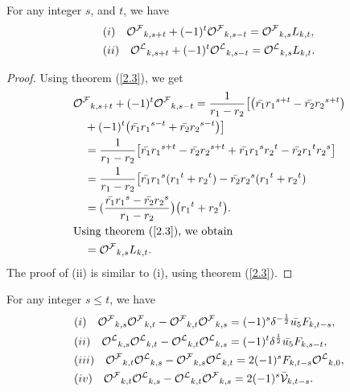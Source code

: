 \begin{theorem} For any integer $s$, and $ t$,  we have\label{2.14t}
\begin{align*}
&(i)\quad {{\mathcal{O^F}}}_{k, s+t}+(-1)^{t}{{\mathcal{O^F}}}_{k,s-t}={{\mathcal{O^F}}}_{k,s}L_{k,t},\\
&(ii)\quad {{\mathcal{O^L}}}_{k, s+t}+(-1)^{t}{{\mathcal{O^L}}}_{k,s-t}={{\mathcal{O^L}}}_{k,s}L_{k,t}.
\end{align*}
\end{theorem}
\begin{proof}
Using theorem (\ref{2.3}), we get
\begin{align*}
&{{\mathcal{O^F}}}_{k, s+t}+(-1)^{t}{{\mathcal{O^F}}}_{k,s-t}=\dfrac{1}{r_1-r_2}\big[\big(\bar{r_1}{r_1}^{s+t}-\bar{r_2}{r_2}^{s+t}\big)\\
&\quad +(-1)^t\big(\bar{r_1}{r_1}^{s-t}+\bar{r_2}{r_2}^{s-t}\big)\big]\\
&\quad= \frac{1}{r_1-r_2}\big[\bar{r_1}{r_1}^{s+t}-\bar{r_2}{r_2}^{s+t}+\bar{r_1}{r_1}^{s}{r_2}^t-\bar{r_2}{r_1}^{t}{r_2}^s\big]\\
&\quad = \frac{1}{r_1-r_2}\big[\bar{r_1}{r_1}^{s}({r_1}^t+{r_2}^t)-\bar{r_2}{r_2}^{s}({r_1}^t+{r_2}^t)\\
&\quad =(\dfrac{\bar{r_1}{r_1}^{s}-\bar{r_2}{r_2}^{s}}{r_1-r_2}\big)\big({r_1}^t+{r_2}^t\big).\\
&\text{Using theorem (\ref{2.3}), we obtain}\\
& \quad ={{\mathcal{O^F}}}_{k,s}L_{k,t}.
\end{align*}
The proof of (ii) is similar to (i), using theorem (\ref{2.3}).
\end{proof}
\begin{theorem} For any integer $s\leq t$,  we have\label{2.15t}
\begin{align*}
&(i)\quad {{\mathcal{O^F}}}_{k, s}{{\mathcal{O^F}}}_{k,t}-{{\mathcal{O^F}}}_{k,t}{{\mathcal{O^F}}}_{k,s}=(-1)^s{\delta}^{-\frac{1}{2}}\bar{u_5} F_{k, t-s},\\
&(ii)\quad {{\mathcal{O^L}}}_{k, s}{{\mathcal{O^L}}}_{k,t}-{{\mathcal{O^L}}}_{k,t}{{\mathcal{O^L}}}_{k,s}=(-1)^t{\delta}^{\frac{1}{2}}\bar{u_5} F_{k, s-t},\\
&(iii)\quad {{\mathcal{O^F}}}_{k, t}{{\mathcal{O^L}}}_{k,s}-{{\mathcal{O^F}}}_{k,s}{{\mathcal{O^L}}}_{k,t}=2(-1)^sF_{k, t-s}{{\mathcal{O^L}}}_{k,0},\\
&(iv)\quad {{\mathcal{O^F}}}_{k, t}{{\mathcal{O^L}}}_{k,s}-{{\mathcal{O^L}}}_{k,t}{{\mathcal{O^F}}}_{k,s}=2(-1)^s\bar{\mathcal{V}}_{k,t-s}.
\end{align*}
\end{theorem}
